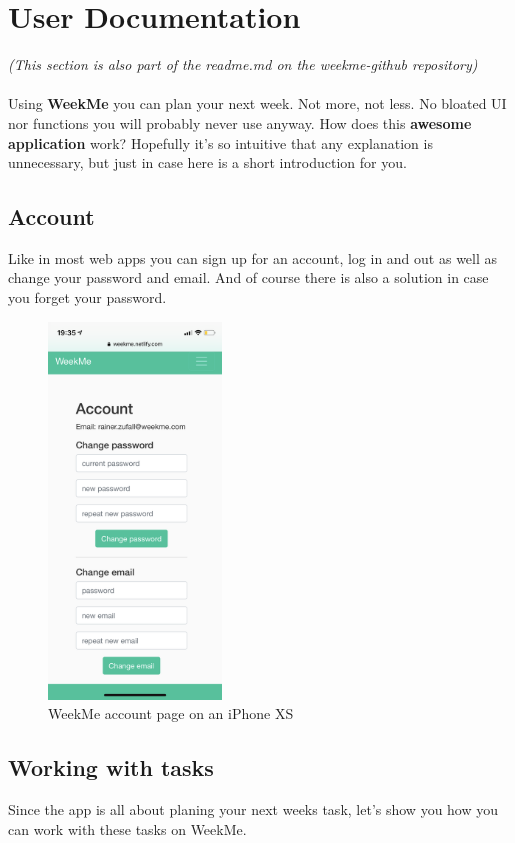 \section{User Documentation}
\textit{(This section is also part of the readme.md on the weekme-github repository)} \\
\\Using \textbf{WeekMe} you can plan your next week. Not more, not less. No bloated UI nor functions you will probably never use anyway. 
How does this \textbf{awesome application} work? Hopefully it's so intuitive that any explanation is unnecessary, but just in case here is a short introduction for you.

\subsection{Account}
Like in most web apps you can sign up for an account, log in and out as well as change your password and email. And of course there is also a solution in case you forget your password. 
\begin{figure}[H] 
	\centering 
	\includegraphics[height=10cm]{figures/user_docu_accounts_page.PNG}   
	\caption[WeekMe account page]{WeekMe account page on an iPhone XS}       
	\label{fig: Setting an environment variable in Heroku}     
\end{figure}  

\subsection{Working with tasks}
Since the app is all about planing your next weeks task, let's show you how you can work with these tasks on WeekMe. 
